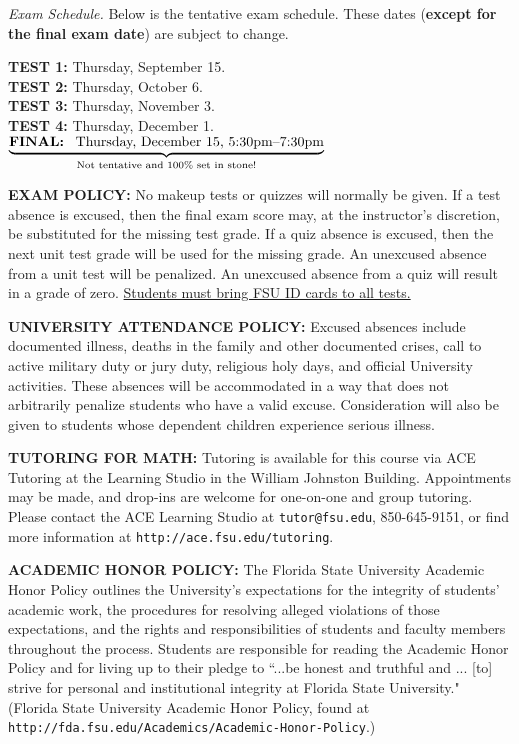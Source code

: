 \documentclass[12pt,oneside]{amsart}
\begin{document}
\noindent \textit{Exam Schedule.} Below is the tentative exam schedule. These dates (\textbf{except for the final exam date}) are subject to change.

\indent \textbf{TEST 1:} Thursday, September 15.
\\
\indent \textbf{TEST 2:} Thursday, October 6.
\\
\indent \textbf{TEST 3:} Thursday, November 3.
\\
\indent \textbf{TEST 4:} Thursday, December 1.
\\[3mm]
\indent $\underbrace{\text{\textbf{FINAL:}\;\;\;Thursday, December 15, 5:30pm--7:30pm}}_\text{Not tentative and 100\% set in stone!}$

\noindent \textbf{EXAM POLICY:} No makeup tests or quizzes will normally be given. If a test absence is excused, then the final exam score may, at the instructor's discretion, be substituted for the missing test grade. If a quiz absence is excused, then the next unit test grade will be used for the missing grade. An unexcused absence from a unit test will be penalized. An unexcused absence from a quiz will result in a grade of
zero. \ul{Students must bring FSU ID cards to all tests.}

\noindent \textbf{UNIVERSITY ATTENDANCE POLICY:} Excused absences include documented illness, deaths in the family and other documented crises, call to active military duty or jury duty, religious holy days, and official University activities. These absences will be accommodated in a way that does not arbitrarily penalize students who have a valid excuse. Consideration will also be given to students whose dependent children experience serious illness.

\noindent \textbf{TUTORING FOR MATH:} Tutoring is available for this course via ACE Tutoring at the Learning Studio in the William Johnston Building.  Appointments may be made, and drop-ins are welcome for one-on-one and group tutoring.  Please contact the ACE Learning Studio at \texttt{tutor@fsu.edu}, 850-645-9151, or find more information at \texttt{http://ace.fsu.edu/tutoring}.

\noindent \textbf{ACADEMIC HONOR POLICY:} The Florida State University Academic Honor Policy outlines the University's expectations for the integrity of students' academic work, the procedures for resolving alleged violations of those expectations, and the rights and responsibilities of students and faculty members throughout the process. Students are responsible for reading the Academic Honor Policy and for living up to their pledge to ``...be honest and truthful and ... [to] strive for personal and institutional integrity at Florida State University." (Florida State University Academic Honor Policy, found at \texttt{http://fda.fsu.edu/Academics/Academic-Honor-Policy}.)
\end{document}
